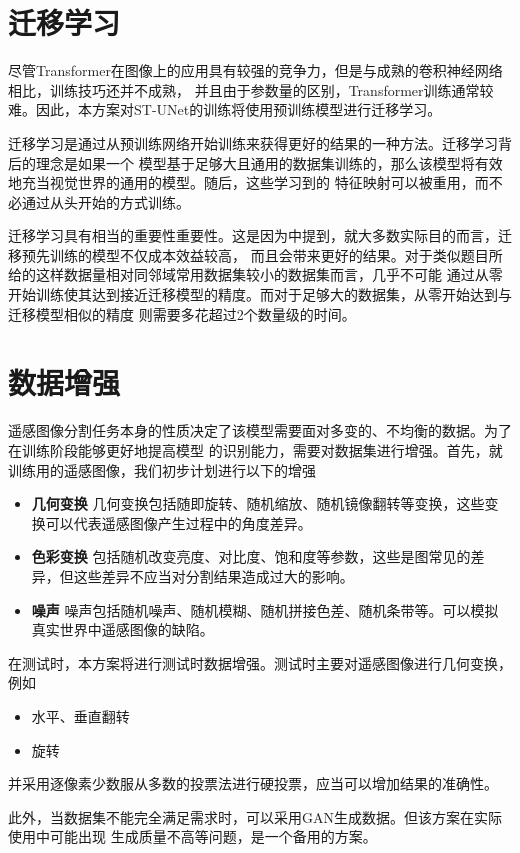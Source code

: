\documentclass[a4paper,twoside,zihao=5,UTF8]{ctexrep}
\begin{document}
\section{迁移学习}

尽管Transformer在图像上的应用具有较强的竞争力，但是与成熟的卷积神经网络相比，训练技巧还并不成熟\cite{howtotrain}，
并且由于参数量的区别，Transformer训练通常较难。因此，本方案对ST-UNet的训练将使用预训练模型进行迁移学习。

迁移学习是通过从预训练网络开始训练来获得更好的结果的一种方法。迁移学习背后的理念是如果一个
模型基于足够大且通用的数据集训练的，那么该模型将有效地充当视觉世界的通用的模型。随后，这些学习到的
特征映射可以被重用，而不必通过从头开始的方式训练。

迁移学习具有相当的重要性重要性。这是因为\cite{howtotrain}中提到，就大多数实际目的而言，迁移预先训练的模型不仅成本效益较高，
而且会带来更好的结果。对于类似题目所给的这样数据量相对同邻域常用数据集较小的数据集而言，几乎不可能
通过从零开始训练使其达到接近迁移模型的精度。而对于足够大的数据集，从零开始达到与迁移模型相似的精度
则需要多花超过2个数量级的时间。


\section{数据增强}

遥感图像分割任务本身的性质决定了该模型需要面对多变的、不均衡的数据。为了在训练阶段能够更好地提高模型
的识别能力，需要对数据集进行增强。首先，就训练用的遥感图像，我们初步计划进行以下的增强
\begin{itemize}
    \item \textbf{几何变换} 几何变换包括随即旋转、随机缩放、随机镜像翻转等变换，这些变换可以代表遥感图像产生过程中的角度差异。
    \item \textbf{色彩变换} 包括随机改变亮度、对比度、饱和度等参数，这些是图常见的差异，但这些差异不应当对分割结果造成过大的影响。
    \item \textbf{噪声} 噪声包括随机噪声、随机模糊、随机拼接色差、随机条带等。可以模拟真实世界中遥感图像的缺陷。
\end{itemize}
在测试时，本方案将进行测试时数据增强。测试时主要对遥感图像进行几何变换，例如
\begin{itemize}
    \item 水平、垂直翻转
    \item 旋转
\end{itemize}
并采用逐像素少数服从多数的投票法进行硬投票，应当可以增加结果的准确性。

此外，当数据集不能完全满足需求时，可以采用GAN\cite{ganaug}生成数据。但该方案在实际使用中可能出现
生成质量不高等问题，是一个备用的方案。
\end{document}
